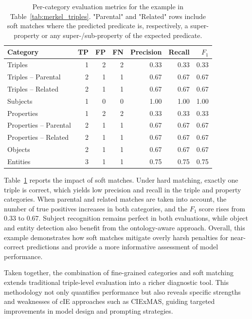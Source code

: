 \documentclass[a4paper,oneside,bibliography=totoc]{scrbook}
\begin{document}
\begin{table}[ht]
  \centering
  \label{tab:merkel_metrics}
  \begin{tabular}{lrrrrrr}
    \toprule
    Category               & TP & FP & FN & Precision & Recall & $F_1$ \\ \midrule
    Triples                & 1  & 2  & 2  & 0.33      & 0.33   & 0.33  \\
    Triples -- Parental    & 2  & 1  & 1  & 0.67      & 0.67   & 0.67  \\
    Triples -- Related     & 2  & 1  & 1  & 0.67      & 0.67   & 0.67  \\
    Subjects               & 1  & 0  & 0  & 1.00      & 1.00   & 1.00  \\
    Properties             & 1  & 2  & 2  & 0.33      & 0.33   & 0.33  \\
    Properties -- Parental & 2  & 1  & 1  & 0.67      & 0.67   & 0.67  \\
    Properties -- Related  & 2  & 1  & 1  & 0.67      & 0.67   & 0.67  \\
    Objects                & 2  & 1  & 1  & 0.67      & 0.67   & 0.67  \\
    Entities               & 3  & 1  & 1  & 0.75      & 0.75   & 0.75  \\
    \bottomrule
  \end{tabular}
  \caption{Per-category evaluation metrics for the example in Table~\ref{tab:merkel_triples}. "Parental" and "Related" rows include soft matches where the predicted predicate is, respectively, a super-property or any super-/sub-property of the expected predicate.}
\end{table}

Table~\ref{tab:merkel_metrics} reports the impact of soft matches. Under hard matching, exactly one triple is correct, which yields low precision and recall in the triple and property categories. When parental and related matches are taken into account, the number of true positives increases in both categories, and the $F_1$ score rises from $0.33$ to $0.67$. Subject recognition remains perfect in both evaluations, while object and entity detection also benefit from the ontology-aware approach. Overall, this example demonstrates how soft matches mitigate overly harsh penalties for near-correct predictions and provide a more informative assessment of model performance.

Taken together, the combination of fine-grained categories and soft matching extends traditional triple-level evaluation into a richer diagnostic tool. This methodology not only quantifies performance but also reveals specific strengths and weaknesses of \ac{cIE} approaches such as CIExMAS, guiding targeted improvements in model design and prompting strategies.
\end{document}
